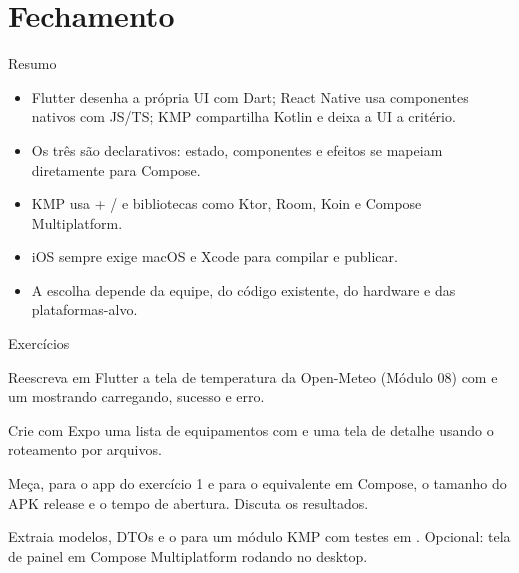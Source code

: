 \documentclass[aspectratio=169,10pt]{beamer}
\begin{document}
\section{Fechamento}

\begin{frame}{Resumo}
  \begin{resumo}
    \begin{itemize}
      \item Flutter desenha a própria UI com Dart; React Native usa componentes nativos com JS/TS; KMP compartilha Kotlin e deixa a UI a critério.
      \item Os três são declarativos: estado, componentes e efeitos se mapeiam diretamente para Compose.
      \item KMP usa  + / e bibliotecas como Ktor, Room, Koin e Compose Multiplatform.
      \item iOS sempre exige macOS e Xcode para compilar e publicar.
      \item A escolha depende da equipe, do código existente, do hardware e das plataformas-alvo.
    \end{itemize}
  \end{resumo}
\end{frame}

\begin{frame}{Exercícios}
  \begin{exercicio}
    Reescreva em Flutter a tela de temperatura da Open-Meteo (Módulo 08) com  e um  mostrando carregando, sucesso e erro.
  \end{exercicio}
  \begin{exercicio}
    Crie com Expo uma lista de equipamentos com  e uma tela de detalhe usando o roteamento por arquivos.
  \end{exercicio}
  \begin{exercicio}
    Meça, para o app do exercício 1 e para o equivalente em Compose, o tamanho do APK release e o tempo de abertura. Discuta os resultados.
  \end{exercicio}
  \begin{projeto}
    Extraia modelos, DTOs e o  para um módulo  KMP com testes em . Opcional: tela de painel em Compose Multiplatform rodando no desktop.
  \end{projeto}
\end{frame}
\end{document}
